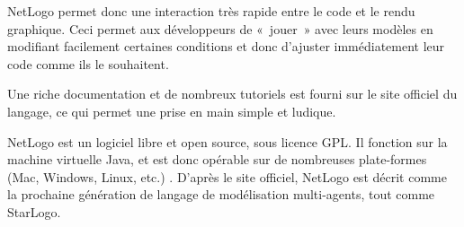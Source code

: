 NetLogo permet donc une interaction très rapide entre le code et le rendu graphique. Ceci permet aux développeurs de « jouer » avec leurs modèles en modifiant facilement certaines conditions et donc d'ajuster immédiatement leur code comme ils le souhaitent.



Une riche documentation et de nombreux tutoriels est fourni sur le site officiel du langage, ce qui permet une prise en main simple et ludique.



NetLogo est un logiciel libre et open source, sous licence GPL. Il fonction sur la machine virtuelle Java, et est donc opérable sur de nombreuses plate-formes (Mac, Windows, Linux, etc.) .
D'après le site officiel, NetLogo est décrit comme la prochaine génération de langage de modélisation multi-agents, tout comme StarLogo.



